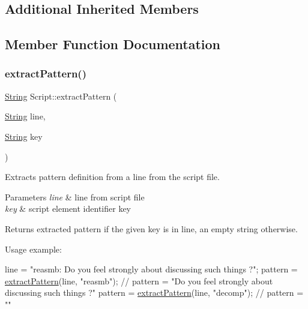 \subsection*{Additional Inherited Members}


\subsection{Member Function Documentation}
\mbox{\label{classScript_a946d037839b4caada09e22a428c8f42e}} 
\subsubsection{\texorpdfstring{extract\+Pattern()}{extractPattern()}}
{\footnotesize\ttfamily \mbox{\hyperlink{classString}{String}} Script\+::extract\+Pattern (\begin{DoxyParamCaption}\item[{\mbox{\hyperlink{classString}{String}}}]{line,  }\item[{\mbox{\hyperlink{classString}{String}}}]{key }\end{DoxyParamCaption})\hspace{0.3cm}{\ttfamily [private]}}

Extracts pattern definition from a line from the script file. 
\begin{DoxyParams}{Parameters}
{\em line} & line from script file \\
\hline
{\em key} & script element identifier key \\
\hline
\end{DoxyParams}
\begin{DoxyReturn}{Returns}
extracted pattern if the given key is in line, an empty string otherwise.
\end{DoxyReturn}
Usage example\+: 
\begin{DoxyCode}
line = \textcolor{stringliteral}{"reasmb: Do you feel strongly about discussing such things ?"};
pattern = \mbox{\hyperlink{classScript_a946d037839b4caada09e22a428c8f42e}{extractPattern}}(line, \textcolor{stringliteral}{"reasmb"}); \textcolor{comment}{// pattern = "Do you feel strongly about discussing
       such things ?"}
pattern = \mbox{\hyperlink{classScript_a946d037839b4caada09e22a428c8f42e}{extractPattern}}(line, \textcolor{stringliteral}{"decomp"}); \textcolor{comment}{// pattern = ""}
\end{DoxyCode}
 \mbox{\label{classScript_a027acbd1cfa4440c9eb51a2b6c91c6a0}} 
